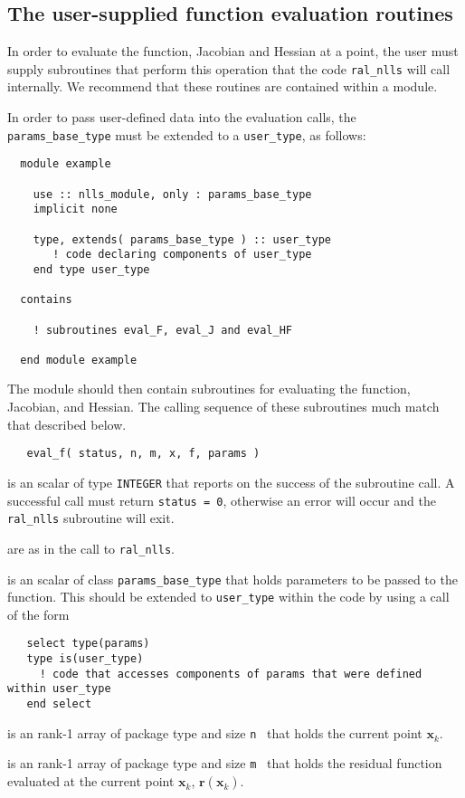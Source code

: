 \documentclass{hslspec}
\newcommand{\scalarintegerio}{is an \intentout scalar of type {\tt INTEGER} }
\newcommand{\ronearrayrealii}[1]{is an \intentin rank-1 array of package type and size {\tt #1}\ }
\newcommand{\ronearrayrealio}[1]{is an \intentout rank-1 array of package type and size {\tt #1}\ }
\newcommand{\vx}{ {\bm x} } %
\newcommand{\vr}{ {\bm r} } %
\newcommand{\iter}[2][k]{ #2_{#1}^{}} %
\begin{document}
\subsection{The user-supplied function evaluation routines}
\label{sec::function_eval}
In order to evaluate the function, Jacobian and Hessian at a point, the user must supply
subroutines that perform this operation that the code {\tt ral\_nlls} will call internally.  
We recommend that these routines are contained within a module.

In order to pass user-defined data into the evaluation calls, the {\tt params\_base\_type} must be extended to a {\tt user\_type}, as follows:
\begin{verbatim}
  module example

    use :: nlls_module, only : params_base_type
    implicit none

    type, extends( params_base_type ) :: user_type
       ! code declaring components of user_type 
    end type user_type
  
  contains 

    ! subroutines eval_F, eval_J and eval_HF

  end module example
\end{verbatim}
The module should then contain subroutines for evaluating the function, Jacobian, and Hessian.
The calling sequence of these subroutines much match that described below.

\begin{verbatim}
   eval_f( status, n, m, x, f, params )
\end{verbatim}

\begin{description}
   \scalarintegerio that reports on the success of the subroutine call.  
  A successful call must return {\tt status = 0}, otherwise an error will occur and the 
  {\tt ral\_nlls} subroutine will  exit.

   are as in the call to {\tt ral\_nlls}.

   is an \intentin scalar of class {\tt params\_base\_type} that holds parameters to be passed to the function.  This should be extended to {\tt user\_type} within the code by using a call of the form
\begin{verbatim}
   select type(params)
   type is(user_type)
     ! code that accesses components of params that were defined within user_type 
   end select
\end{verbatim}

   \ronearrayrealii{n} that holds the current point $\iter{\vx}$.
  
   \ronearrayrealio{m} that holds the residual function 
  evaluated at the current point $\iter{\vx}$, $\vr(\iter{\vx})$.
  
\end{description}
\end{document}
